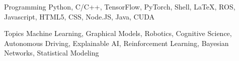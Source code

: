 


\begin{cvskills}


\cvskill
{Programming} %
{Python, C/C++, TensorFlow, PyTorch, Shell, LaTeX, ROS, Javascript, HTML5, CSS, Node.JS, Java, CUDA} %


\cvskill
{Topics} %
{Machine Learning, Graphical Models, Robotics, Cognitive Science, Autonomous Driving, Explainable AI, Reinforcement Learning, Bayesian Networks, Statistical Modeling} %



\end{cvskills}